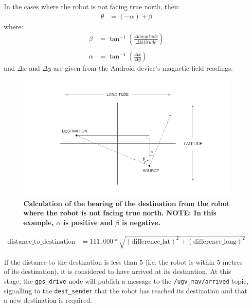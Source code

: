 \documentclass[titlepage,12pt,a4paper]{article}
\begin{document}
In the cases where the robot is not facing true north, then:
\begin{align*}
	\theta	&=	(-\alpha) + \beta
\end{align*}
where:
\begin{align*}
	\beta		&=	\tan^{-1}({\frac{\Delta{longitude}}{\Delta{latitude}}})\\ \\
	\alpha	&=	\tan^{-1}(\frac{\Delta{x}}{\Delta{y}})
\end{align*}
and $\Delta{x}$ and $\Delta{y}$ are given from the Android device's magnetic field readings.

\begin{figure}[h]
	\centering
	\includegraphics[scale=0.5]{bearingsOffset.png}
	\caption{\textbf{Calculation of the bearing of the destination from the robot where the robot is not facing true north. NOTE: In this example, $\alpha$ is positive and $\beta$ is negative.}}
\end{figure}





\begin{align*}
	\text{distance\_to\_destination}	&= 	111,000 * \sqrt{(\text{difference\_lat})^2 + (\text{difference\_long})^2}
\end{align*}

If the distance to the destination is less than 5 (i.e. the robot is within 5 metres of its destination), it is considered to have arrived at its destination. At this stage, the \verb|gps_drive| node will publish a message to the \verb|/ugv_nav/arrived| topic, signalling to the \verb|dest_sender| that the robot has reached its destination and that a new destination is required.
\end{document}

